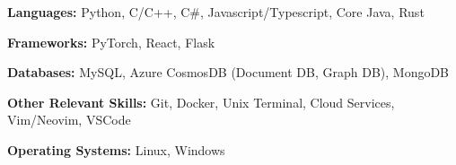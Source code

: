 \textbf{Languages:} Python, C/C++, C\#, Javascript/Typescript, Core Java, Rust

\textbf{Frameworks:} PyTorch, React, Flask

\textbf{Databases:} MySQL, Azure CosmosDB (Document DB, Graph DB), MongoDB

\textbf{Other Relevant Skills:} Git, Docker, Unix Terminal, Cloud Services, Vim/Neovim, VSCode

\textbf{Operating Systems:} Linux, Windows
